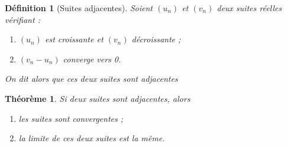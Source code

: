 \documentclass[12pt,a4paper,french]{article}
\theoremstyle{break}
\newtheorem{definition}{Définition}
\newtheorem{theoreme}{Théorème}
\theoremstyle{plain}
\theoremstyle{nonumberplain}
\theoremstyle{nonumberbreak}
\begin{document}
\begin{definition}[Suites adjacentes]
  Soient $(u_n)$ et $(v_n)$ deux suites réelles vérifiant :
  \begin{enumerate}[label=(\roman*)]
    \item $(u_n)$ est croissante et $(v_n)$ décroissante ;
    \item $(v_n - u_n)$ converge vers 0.
  \end{enumerate}

  On dit alors que ces deux suites sont \emph{adjacentes}
\end{definition}

\begin{theoreme}
  Si deux suites sont adjacentes, alors
  \begin{enumerate}[label=\roman*)]
    \item les suites sont convergentes ;
    \item la limite de ces deux suites est la même.
  \end{enumerate}
\end{theoreme}
\end{document}
